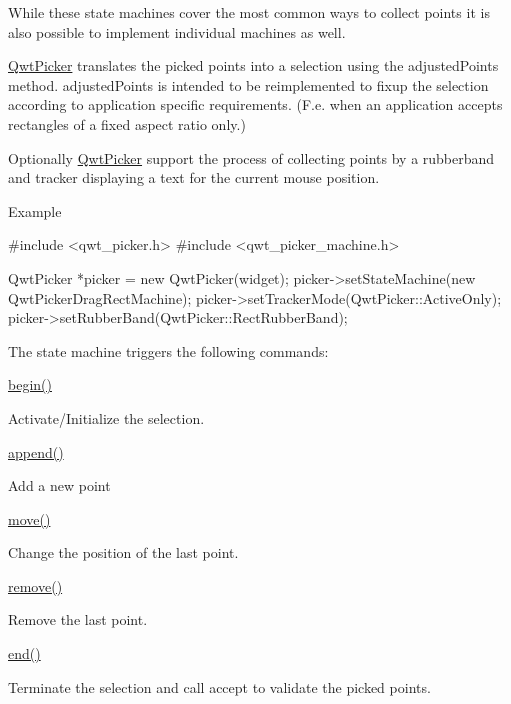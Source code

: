 While these state machines cover the most common ways to collect points it is also possible to implement individual machines as well.

\hyperlink{class_qwt_picker}{Qwt\-Picker} translates the picked points into a selection using the adjusted\-Points method. adjusted\-Points is intended to be reimplemented to fixup the selection according to application specific requirements. (F.\-e. when an application accepts rectangles of a fixed aspect ratio only.)

Optionally \hyperlink{class_qwt_picker}{Qwt\-Picker} support the process of collecting points by a rubberband and tracker displaying a text for the current mouse position.

\begin{DoxyParagraph}{Example}
\begin{DoxyVerb}#include <qwt_picker.h>
#include <qwt_picker_machine.h>

QwtPicker *picker = new QwtPicker(widget);
picker->setStateMachine(new QwtPickerDragRectMachine);
picker->setTrackerMode(QwtPicker::ActiveOnly);
picker->setRubberBand(QwtPicker::RectRubberBand); \end{DoxyVerb}
\par

\end{DoxyParagraph}
The state machine triggers the following commands\-:


\begin{DoxyItemize}
\item \hyperlink{class_qwt_picker_a49cb19aea451e275c5d376235e5a1d83}{begin()}\par
 Activate/\-Initialize the selection.
\item \hyperlink{class_qwt_picker_a5dd2e0ce6b2a6cc50e345ec13aef9255}{append()}\par
 Add a new point
\item \hyperlink{class_qwt_picker_a59d92670978f200edb61e429afa06542}{move()} \par
 Change the position of the last point.
\item \hyperlink{class_qwt_picker_a217ae414d4967e66def863b019194661}{remove()}\par
 Remove the last point.
\item \hyperlink{class_qwt_picker_ad258c518257cf2f52326905a36efb0c4}{end()}\par
 Terminate the selection and call accept to validate the picked points.
\end{DoxyItemize}

